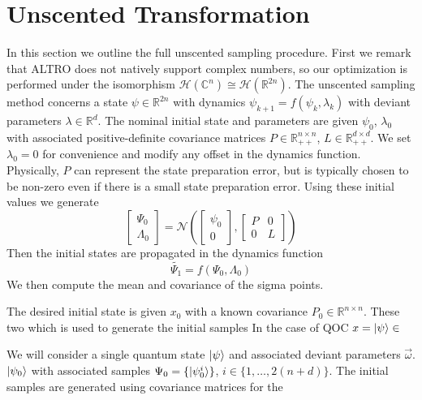\section{Unscented Transformation}
In this section we outline the full unscented sampling procedure.
First we remark that ALTRO does not natively support complex numbers, so our optimization
is performed under the isomorphism $\mathcal{H}(\mathbb{C}^{n}) \cong \mathcal{H}(\mathbb{R}^{2n})$.
The unscented sampling method concerns a state $\psi \in \mathbb{R}^{2n}$ with dynamics
$\psi_{k + 1} = f(\psi_{k}, \lambda_{k})$ with deviant parameters $\lambda \in \mathbb{R}^{d}$.
The nominal initial state and parameters are given $\psi_{0}$, $\lambda_{0}$ with associated
positive-definite covariance matrices $P \in \mathbb{R}_{++}^{n \times n}$,
$L \in \mathbb{R}_{++}^{d \times d}$. We set $\lambda_{0} = 0$ for convenience and modify
any offset in the dynamics function. Physically, $P$ can represent the state preparation error,
but is typically chosen to be non-zero even if there is a small state preparation error.
Using these initial values we generate
\begin{equation}
  \begin{bmatrix} \Psi_{0} \\ \Lambda_{0} \end{bmatrix} = \mathcal{N}(
  \begin{bmatrix} \psi_{0} \\ 0\end{bmatrix}, \begin{bmatrix} P & 0\\ 0 & L\end{bmatrix})
\end{equation}
Then the initial states are propagated in the dynamics function
\begin{equation}
  \tilde{\Psi_{1}} = f(\Psi_{0}, \Lambda_{0})
\end{equation}
We then compute the mean and covariance of the sigma points.



The desired initial state is given $x_{0}$ with a known covariance $P_{0} \in \mathbb{R}^{n \times n}$.
These two 
which is used to generate the initial samples 
In the case of QOC $x = \ket{\psi} \in $

We will consider a single quantum state $\ket{\psi}$ and associated
deviant parameters $\vec{\omega}$. $\ket{\psi_{0}}$
with associated samples $\Psi_{0} = \{\ket{\psi_{0}^{i}}\}$, $i \in \{1, \dots, 2(n + d)\}$.
The initial samples are generated using covariance matrices for the


